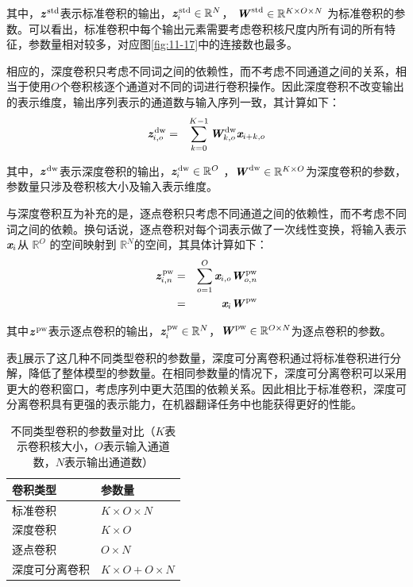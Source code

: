 \noindent 其中，$ \textbf{\em z}^\textrm{\,std}$表示标准卷积的输出，$ \textbf{\em z}_i^\textrm{\,std} \in \mathbb{R}^N$， $\textbf{\em W}^\textrm{\,std} \in \mathbb{R}^{K \times O \times N} $ 为标准卷积的参数。可以看出，标准卷积中每个输出元素需要考虑卷积核尺度内所有词的所有特征，参数量相对较多，对应图\ref{fig:11-17}中的连接数也最多。

\parinterval 相应的，深度卷积只考虑不同词之间的依赖性，而不考虑不同通道之间的关系，相当于使用$O$个卷积核逐个通道对不同的词进行卷积操作。因此深度卷积不改变输出的表示维度，输出序列表示的通道数与输入序列一致，其计算如下：
\begin{eqnarray}
\textbf{\em z}_{i,o}^\textrm{\,dw} &=& \sum_{k=0}^{K-1} \textbf{\em W}_{k,o}^\textrm{\,dw} \textbf{\em x}_{i+k,o}
\label{eq:11-19}
\end{eqnarray}

\noindent 其中，$\textbf{\em z}^\textrm{\,dw}$表示深度卷积的输出，$\textbf{\em z}_i^\textrm{\,dw} \in \mathbb{R}^{O}$ ，$\textbf{\em W}^\textrm{\,dw} \in \mathbb{R}^{K \times O}$为深度卷积的参数，参数量只涉及卷积核大小及输入表示维度。

\parinterval 与深度卷积互为补充的是，逐点卷积只考虑不同通道之间的依赖性，而不考虑不同词之间的依赖。换句话说，逐点卷积对每个词表示做了一次线性变换，将输入表示$\textbf{\em x}_i$从 $\mathbb{R}^{O}$ 的空间映射到 $\mathbb{R}^{N}$的空间，其具体计算如下：
\begin{eqnarray}
\textbf{\em z}_{i,n}^\textrm{\,pw} &=& \sum\limits_{o=1}^{O} \textbf{\em x}_{i,o} \textbf{\em W}_{o,n}^\textrm{\,pw} \nonumber \\
                      &=& \textbf{\em x}_i \textbf{\em W}^\textrm{\,pw}
\label{eq:11-20}
\end{eqnarray}

\noindent 其中$\textbf{\em z}^\textrm{\,pw}$表示逐点卷积的输出，$\textbf{\em z}_{i}^\textrm{\,pw} \in  \mathbb{R}^{N}$，$\textbf{\em W}^\textrm{\,pw} \in \mathbb{R}^{O \times N}$为逐点卷积的参数。

\parinterval 表\ref{tab:11-1}展示了这几种不同类型卷积的参数量，深度可分离卷积通过将标准卷积进行分解，降低了整体模型的参数量。在相同参数量的情况下，深度可分离卷积可以采用更大的卷积窗口，考虑序列中更大范围的依赖关系。因此相比于标准卷积，深度可分离卷积具有更强的表示能力，在机器翻译任务中也能获得更好的性能。

\begin{table}[htp]
\centering
\caption{不同类型卷积的参数量对比（$K$表示卷积核大小，$O$表示输入通道数，$N$表示输出通道数）}
\label{tab:11-1}
\begin{tabular}{l | l}
卷积类型 & 参数量 \\ \hline
\rule{0pt}{12pt}标准卷积 & $K \times O \times N$ \\
深度卷积 & $K \times O$ \\
逐点卷积 & $O \times N$ \\
深度可分离卷积 & $K \times O + O \times N $
\end{tabular}
\end{table}

